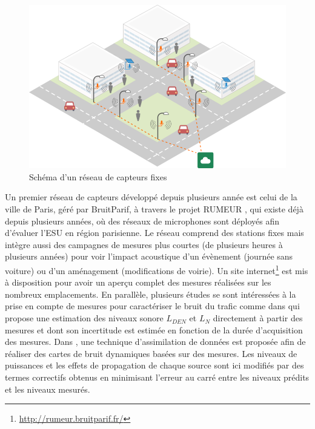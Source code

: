 \begin{figure}[t]
\centering
\includegraphics[width=0.8\linewidth]{./figures/cartographie/reseau_mesure.png}
\caption[Schéma d'un réseau de capteurs fixes]{Schéma d'un réseau de capteurs fixes\protect\footnotemark}
\label{fig:reseau_capteur}
\end{figure}


Un premier réseau de capteurs développé depuis plusieurs année est celui de la ville de Paris, géré par BruitParif, à travers le projet RUMEUR \cite{mietlicki2012innovative}, qui existe déjà depuis plusieurs années, où des réseaux de microphones sont déployés afin d'évaluer l'ESU en région parisienne. Le réseau comprend des stations fixes mais intègre aussi des campagnes de mesures plus courtes (de plusieurs heures à plusieurs années) pour voir l'impact acoustique d'un évènement (journée sans voiture) ou d'un aménagement (modifications de voirie). Un site internet\footnote{\url{http://rumeur.bruitparif.fr/}} est mis à disposition pour avoir un aperçu complet des mesures réalisées sur les nombreux emplacements.
En parallèle, plusieurs études se sont intéressées à la prise en compte de mesures pour caractériser le bruit du trafic comme dans \cite{makarewicz_empirical_2011} qui propose une estimation des niveaux sonore $L_{DEN}$ et $L_N$ directement à partir des mesures et dont son incertitude est estimée en fonction de la durée d'acquisition des mesures. Dans \cite{wei_dynamic_2016}, une technique d'assimilation de données est proposée afin de réaliser des cartes de bruit dynamiques basées sur des mesures. Les niveaux de puissances et les effets de propagation de chaque source sont ici modifiés par des termes correctifs obtenus en minimisant l'erreur au carré entre les niveaux prédits et les niveaux mesurés.

